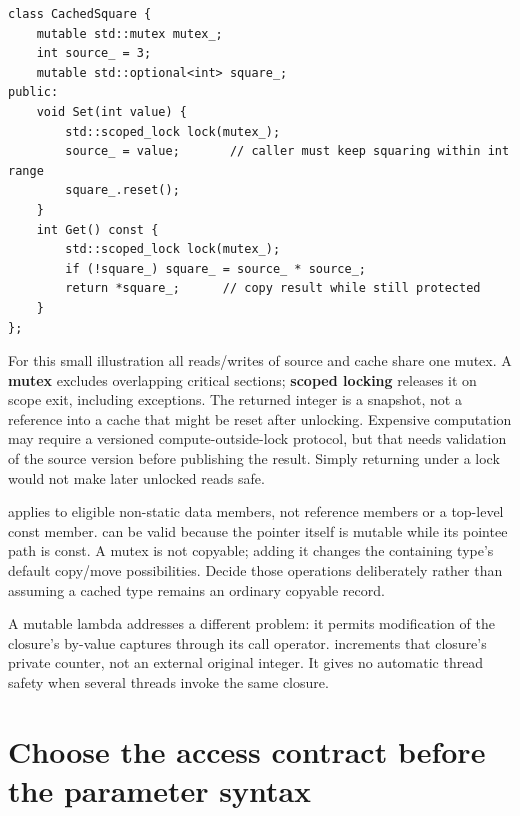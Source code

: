 \begin{verbatim}
class CachedSquare {
    mutable std::mutex mutex_;
    int source_ = 3;
    mutable std::optional<int> square_;
public:
    void Set(int value) {
        std::scoped_lock lock(mutex_);
        source_ = value;       // caller must keep squaring within int range
        square_.reset();
    }
    int Get() const {
        std::scoped_lock lock(mutex_);
        if (!square_) square_ = source_ * source_;
        return *square_;      // copy result while still protected
    }
};
\end{verbatim}

For this small illustration all reads/writes of source and cache share one mutex. A \textbf{mutex} excludes overlapping critical sections; \textbf{scoped locking} releases it on scope exit, including exceptions. The returned integer is a snapshot, not a reference into a cache that might be reset after unlocking. Expensive computation may require a versioned compute-outside-lock protocol, but that needs validation of the source version before publishing the result. Simply returning  under a lock would not make later unlocked reads safe.

 applies to eligible non-static data members, not reference members or a top-level const member.  can be valid because the pointer itself is mutable while its pointee path is const. A mutex is not copyable; adding it changes the containing type's default copy/move possibilities. Decide those operations deliberately rather than assuming a cached type remains an ordinary copyable record.

A mutable lambda addresses a different problem: it permits modification of the closure's by-value captures through its call operator.  increments that closure's private counter, not an external original integer. It gives no automatic thread safety when several threads invoke the same closure.

\section{Choose the access contract before the parameter syntax}\label{05-engine-i-ch003-choose-the-access-contract-before-the-parameter-syntax}

